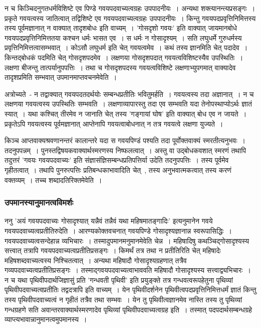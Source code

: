 		न च किञ्चिदनुगतधर्मविशिष्टे एव पिण्डे गवयपदवाच्यत्वग्रहः उपपादनीयः~। अन्यथा शक्त्यानन्त्यप्रसङ्गः~। प्रकृते गवयत्वस्य जातित्वात् तद्विशिष्टे एव गवयपदवाच्यत्वग्रहः उपपादनीयः~। किन्तु गवयपदप्रवृत्तिनिमित्तस्य तस्य पूर्वमज्ञानात् न वाक्यात् तादृशबोधः‌ इति वाच्यम्~। 'गोसदृशो गवयः' इति वाक्यात् जायमानबोधे गवयपदप्रवृत्तिनिमित्ततया कश्चन धर्मः भासत एव~। स धर्मः न गोसादृश्यम्~। सति लघुधर्मे गुरुधर्मस्य प्रवृत्तिनिमित्तत्वासम्भवात्~। कोऽसौ लघुधर्म इति चेत् गवयत्वमेव~। कथं तस्य ज्ञानमिति चेत् पदादेव~। किन्तद्बोधकं पदमिति चेत् गोसदृशपदमेव~। लक्षणया गोसदृशपदात् गवयत्वविशिष्टस्यैव उपस्थितिः~। लक्षणा बीजन्तु तात्पर्यानुपपत्तिः~। तथा च गोसदृशपदस्य गवयत्वविशिष्टे लक्षणाभ्युपगमात् वाक्यादेव तादृशप्रमिति सम्भवात् उपमानमाप्तवचनमेवेति~।

		अत्रोच्यते~- न तद्वाक्यात् गवयपदतदर्थयोः सम्बन्धप्रतीतिः भवितुमर्हति~। गवयत्वस्य तदा अज्ञानात्~। न च लक्षणया गवयत्वस्य उपस्थितिः सम्भवति~। लक्षणाव्यापारस्तु तदा एव सम्भवति यदा तेनोपस्थाप्योऽर्थः ज्ञातं स्यात्~। यथा कश्चित् तीरमेव न जानाति चेत् तस्य 'गङ्गायां घोष' इति वाक्यात् बोध एव न जायते~। प्रकृतेऽपि गवयत्वस्य पूर्वमज्ञानात् आप्तेनापि गवयत्वाबोधनात् न तत्र गवयत्वे लक्षणा युज्यते~।

		किञ्च आप्तवाक्यश्रवणानन्तरं कालान्तरे यदा स गवयपिण्डं पश्यति तदा पूर्वोक्तवाक्यं स्मरतीत्यनुभवः~। तदनुपपन्नम्~। पुनस्तद्विषयकवाक्यार्थस्मरणस्य निष्फलत्वात्~। अस्तु वा उद्बोधकवशात् स्मरणं तथापि तदुत्तरं 'गवयः गवयपदवाच्यः' इति संज्ञासंज्ञिसम्बन्धप्रतिपत्तिर्या उदेति तदनुपपत्तिः~। तस्य पूर्वमेव गृहीतत्वात्~। तथापि पुनरुत्पत्तिः प्रतिबन्धकाभावादिति चेत्~, तस्य अनुभवात्मकत्वात् तस्य करणं वक्तव्यम्~। तच्च शब्दादतिरिक्तमेवेति~।

		\subsubsection{उपमानस्यानुमानत्वविमर्शः}

		ननु 'अयं गवयपदवाच्यः गोसादृश्यात् यन्नैवं तन्नैवं यथा महिषमातङ्गादिः' इत्यनुमानेन गवये गवयपदवाच्यत्वप्रतीतिरुदेति~। आरण्यकोक्तवचनात् गवयपिण्डे गोसादृश्यज्ञानान्न स्वरूपासिद्धिः~। गवयपदवाच्यत्वसन्देहान्न व्यभिचारः~। तस्मादुपमानमनुमानमेवेति चेन्न~। महिषादिषु कथञ्चिद्गोसादृश्यस्य सत्त्वात् तत्रापि गवयपदवाच्यत्वप्रतीतिप्रसङ्गः~। किमर्थं तत्र तथा न प्रतीतिरिति चेत् महिषादेः महिषशब्दवाच्यत्वस्य निश्चितत्वात्~। अन्यथा महिषादौ गोसादृश्यग्रहणात् तत्रैव गव्यपदवाच्यत्वप्रतीतिप्रसङ्गः~। तस्माद्गवयपदवाच्यत्वाभाववति महिषादौ गोसादृश्यस्य सत्त्वाद्व्यभिचारः~। न च यथा पृथिवीपदार्थजिज्ञासुं प्रति 'गन्धवती पृथिवी' इति प्रयुङ्क्ते तत्र गन्धवत्वरूपहेतुना पृथिव्यां पृथिवीपदवाच्यत्वप्रतीतिः तद्वदत्रापि इति वाच्यम्~। येन पृथिवीदर्शनेन पृथिवीत्वपदप्रवृत्तिनिमित्तधर्मं ज्ञातं किन्तु तस्य पृथिवीपदवाच्यत्वं न गृहीतं तत्रैव तथा सम्भवः~। येन तु पृथिवीत्वज्ञानमेव नास्ति तस्य तु पृथिव्यां गन्धग्रहणे सति अवान्तरवाक्यार्थस्मरणादेव पृथिव्यां पृथिवीपदवाच्यत्वग्रह इति~। तस्मात् पदपदार्थसम्बन्धग्रहे व्याप्त्यभावान्नानुमानत्वमुपमानस्य~।


